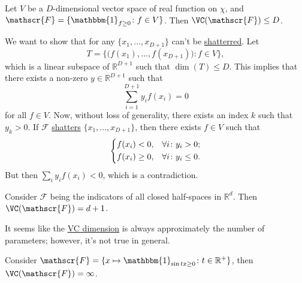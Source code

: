 \begin{eg}
	Let \(V\) be a \(D\)-dimensional vector space of real function on \(\chi \), and \(\mathscr{F} = \{ \mathbbm{1}_{f\geq 0} \colon f \in V\} \). Then \(\VC(\mathscr{F} ) \leq D\).
\end{eg}
\begin{explanation}
	We want to show that for any \(\{ x_1, \dots , x_{D+1} \} \) can't be \hyperref[def:shatter]{shatterred}. Let
	\[
		T = \{ \big( f(x_1), \dots , f(x_{D+1}) \big) \colon f\in V \},
	\]
	which is a linear subspace of \(\mathbb{R} ^{D+1}\) such that \(\dim (T) \leq D\). This implies that there exists a non-zero \(y \in \mathbb{R} ^{D+1}\) such that
	\[
		\sum_{i=1}^{D+1} y_i f(x_i) = 0
	\]
	for all \(f\in V\). Now, without loss of generality, there exists an index \(k\) such that \(y_k > 0\). If \(\mathscr{F} \) \hyperref[def:shatter]{shatters} \(\{ x_1, \dots , x_{D+1} \} \), then there exists \(f\in V\) such that
	\[
		\begin{dcases}
			f(x_i) < 0,    & \forall i\colon y_i > 0  ;  \\
			f(x_i) \geq 0, & \forall i\colon y_i \leq 0.
		\end{dcases}
	\]
	But then \(\sum_{i} y_i f(x_i) < 0\), which is a contradiction.
\end{explanation}

\begin{eg}
	Consider \(\mathscr{F} \) being the indicators of all closed half-spaces in \(\mathbb{R} ^d\). Then \(\VC(\mathscr{F} ) = d+1 \).
\end{eg}

It seems like the \hyperref[def:VC-dimension]{VC dimension} is always approximately the number of parameters; however, it's not true in general.

\begin{eg}
	Consider \(\mathscr{F} = \{ x \mapsto \mathbbm{1}_{\sin tx \geq 0} \colon t \in \mathbb{R} ^+\} \), then \(\VC(\mathscr{F} ) = \infty \).
\end{eg}